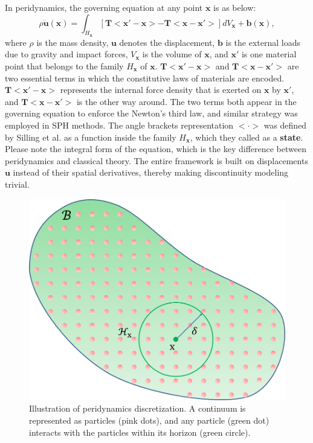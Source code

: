 In peridynamics, the governing equation at any point $\mathbf{x}$ is  as below:
\begin{equation}
\rho\ddot{\mathbf{u}}(\mathbf{x}) = \int_{H_\mathbf{x}}[\mathbf{T}<\mathbf{x}'-\mathbf{x}> - \mathbf{T}<\mathbf{x}-\mathbf{x}'>]dV_{\mathbf{x}}+\mathbf{b}(\mathbf{x}),
\label{eq:1}
\end{equation}
where $\rho$ is the mass density, $\mathbf{u}$ denotes the displacement, $\mathbf{b}$ is the external loads due to gravity and impact forces, $V_\mathbf{x}$ is the volume of $\mathbf{x}$, and $\mathbf{x}'$ is one material point that belongs to the family $H_{\mathbf{x}}$ of $\mathbf{x}$. $\mathbf{T}<\mathbf{x}'-\mathbf{x}>$ and $\mathbf{T}<\mathbf{x}-\mathbf{x}'>$ are two essential terms in which the constitutive laws of materials are encoded. $\mathbf{T}<\mathbf{x}'-\mathbf{x}>$ represents the internal force density that is exerted on $\mathbf{x}$ by $\mathbf{x}'$, and $\mathbf{T}<\mathbf{x}-\mathbf{x}'>$ is the other way around. The two terms both appear in the governing equation to enforce the Newton's third law, and similar strategy was employed in SPH methods\cite{Muller:2003:PFS:846276.846298}. The angle brackets representation $<\cdot>$ was defined by Silling et al. \cite{silling2007peridynamic} as a function inside the family $H_\mathbf{x}$, which they called as a \textbf{state}. Please note the integral form of the equation, which is the key difference between peridynamics and classical theory. The entire framework is built on displacements $\mathbf{u}$ instead of their spatial derivatives, thereby making discontinuity modeling trivial.

\begin{figure}[t]
  \centering
  \includegraphics[width=0.7\linewidth, bb=0 0 440 355]{./figs/peridynamics_circle.png}
  \caption{\label{fig:2}
  Illustration of peridynamics discretization. A continuum is represented as particles (pink dots), and any particle (green dot) interacts with the particles within its horizon (green circle).
}
\end{figure}

